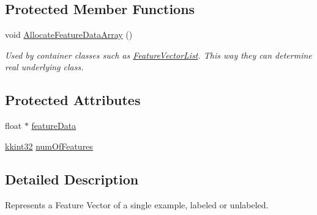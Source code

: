 \subsection*{Protected Member Functions}
\begin{DoxyCompactItemize}
\item 
void \hyperlink{class_k_k_m_l_l_1_1_feature_vector_a74444864ab835396a50803fe808f55fb}{Allocate\+Feature\+Data\+Array} ()
\begin{DoxyCompactList}\small\item\em Used by container classes such as \textquotesingle{}\hyperlink{class_k_k_m_l_l_1_1_feature_vector_list}{Feature\+Vector\+List}\textquotesingle{}. This way they can determine real underlying class. \end{DoxyCompactList}\end{DoxyCompactItemize}
\subsection*{Protected Attributes}
\begin{DoxyCompactItemize}
\item 
float $\ast$ \hyperlink{class_k_k_m_l_l_1_1_feature_vector_a524682151076faab5476be19ac13134d}{feature\+Data}
\item 
\hyperlink{namespace_k_k_b_a8fa4952cc84fda1de4bec1fbdd8d5b1b}{kkint32} \hyperlink{class_k_k_m_l_l_1_1_feature_vector_a90af0bdb76783c1aa52d616dbf46e9e4}{num\+Of\+Features}
\end{DoxyCompactItemize}


\subsection{Detailed Description}
Represents a Feature Vector of a single example, labeled or unlabeled. 

